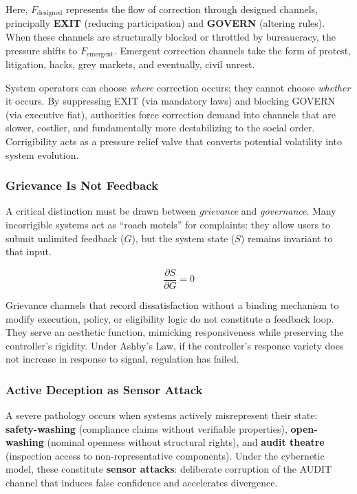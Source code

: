 \documentclass{article}
\begin{document}
Here, $F_{\text{designed}}$ represents the flow of correction through designed channels, principally \textbf{EXIT} (reducing participation) and \textbf{GOVERN} (altering rules). When these channels are structurally blocked or throttled by bureaucracy, the pressure shifts to $F_{\text{emergent}}$. Emergent correction channels take the form of protest, litigation, hacks, grey markets, and eventually, civil unrest.

System operators can choose \textit{where} correction occurs; they cannot choose \textit{whether} it occurs. By suppressing EXIT (via mandatory laws) and blocking GOVERN (via executive fiat), authorities force correction demand into channels that are slower, costlier, and fundamentally more destabilizing to the social order. Corrigibility acts as a pressure relief valve that converts potential volatility into system evolution.

\subsubsection{Grievance Is Not Feedback}
\label{subsec:grievance}

A critical distinction must be drawn between \textit{grievance} and \textit{governance}. Many incorrigible systems act as ``roach motels'' for complaints: they allow users to submit unlimited feedback ($G$), but the system state ($S$) remains invariant to that input.

\begin{equation}
\frac{\partial S}{\partial G} = 0
\label{eq:grievance}
\end{equation}

Grievance channels that record dissatisfaction without a binding mechanism to modify execution, policy, or eligibility logic do not constitute a feedback loop. They serve an aesthetic function, mimicking responsiveness while preserving the controller's rigidity. Under Ashby's Law, if the controller's response variety does not increase in response to signal, regulation has failed.

\subsubsection{Active Deception as Sensor Attack}
\label{subsec:active-deception}

A severe pathology occurs when systems actively misrepresent their state: \textbf{safety-washing} (compliance claims without verifiable properties), \textbf{open-washing} (nominal openness without structural rights), and \textbf{audit theatre} (inspection access to non-representative components). Under the cybernetic model, these constitute \textbf{sensor attacks}: deliberate corruption of the AUDIT channel that induces false confidence and accelerates divergence.
\end{document}
